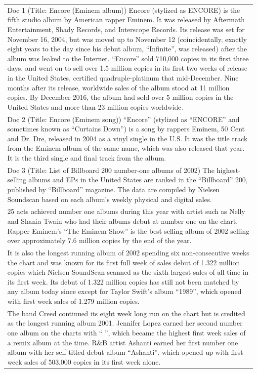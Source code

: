 \documentclass[11pt]{article}
\begin{document}
\begin{longtable}{|p{}|}
Doc 1 (Title: Encore (Eminem album)) Encore (stylized as ENCORE) is the fifth studio album by American rapper Eminem. It was released by Aftermath Entertainment, Shady Records, and Interscope Records. Its release was set for November 16, 2004, but was moved up to November 12 (coincidentally, exactly eight years to the day since his debut album, ``Infinite'', was released) after the album was leaked to the Internet. ``Encore'' sold 710,000 copies in its first three days, and went on to sell over 1.5 million copies in its first two weeks of release in the United States, certified quadruple-platinum that mid-December. Nine months after its release, worldwide sales of the album stood at 11 million copies. By December 2016, the album had sold over 5 million copies in the United States and more than 23 million copies worldwide. \\
Doc 2 (Title: Encore (Eminem song)) ``Encore'' (stylized as ``ENCORE'' and sometimes known as ``Curtains Down'') is a song by rappers Eminem, 50 Cent and Dr. Dre, released in 2004 as a vinyl single in the U.S. It was the title track from the Eminem album of the same name, which was also released that year. It is the third single and final track from the album. \\
Doc 3 (Title: List of Billboard 200 number-one albums of 2002) The highest-selling albums and EPs in the United States are ranked in the ``Billboard'' 200, published by ``Billboard'' magazine. The data are compiled by Nielsen Soundscan based on each album's weekly physical and digital sales. \\
25 acts achieved number one albums during this year with artist such as Nelly and Shania Twain who had their albums debut at number one on the chart. Rapper Eminem's ``The Eminem Show'' is the best selling album of 2002 selling over approximately 7.6 million copies by the end of the year. \\
It is also the longest running album of 2002 spending six non-consecutive weeks the chart and was known for its first full week of sales debut of 1.322 million copies which Nielsen SoundScan scanned as the sixth largest sales of all time in its first week. Its debut of 1.322 million copies has still not been matched by any album today since except for Taylor Swift's album ``1989'', which opened with first week sales of 1.279 million copies. \\
The band Creed continued its eight week long run on the chart but is credited as the longest running album 2001. Jennifer Lopez earned her second number one album on the charts with `` '', which became the highest first week sales of a remix album at the time. R\&B artist Ashanti earned her first number one album with her self-titled debut album ``Ashanti'', which opened up with first week sales of 503,000 copies in its first week alone. \\

\end{longtable}
\end{document}
